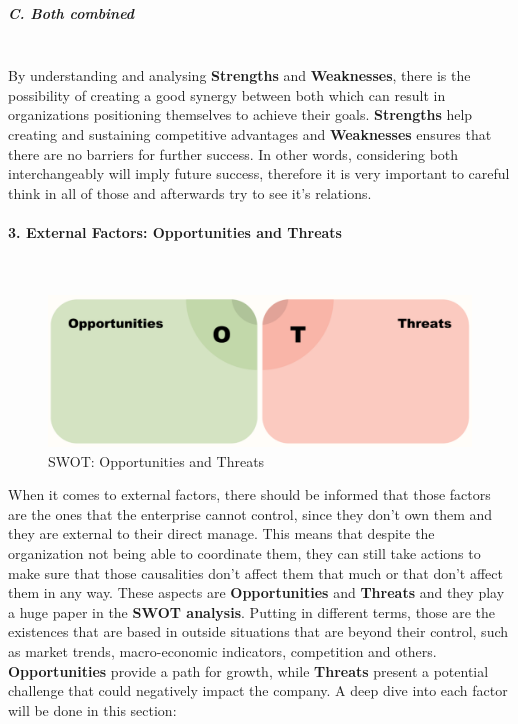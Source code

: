 \subparagraph{C. Both combined}\mbox{}\\
By understanding and analysing \textbf{Strengths} and \textbf{Weaknesses}, there is the possibility of creating a good synergy between both which can result in organizations positioning themselves to achieve their goals. \textbf{Strengths} help creating and sustaining competitive advantages and \textbf{Weaknesses} ensures that there are no barriers for further success. In other words, considering both interchangeably will imply future success, therefore it is very important to careful think in all of those and afterwards try to see it's relations.


\paragraph{3. External Factors: Opportunities and Threats}\mbox{}\\
\begin{figure}[H]
    \centering
    \includegraphics[width=1\textwidth]{assets/swot/opportunities-threats.png} %
    \caption{SWOT: Opportunities and Threats}
    \label{fig:sample-image} 
\end{figure}
When it comes to external factors, there should be informed that those factors are the ones that the enterprise cannot control, since they don't own them and they are external to their direct manage. This means that despite the organization not being able to coordinate them, they can still take actions to make sure that those causalities don't affect them that much or that don't affect them in any way. These aspects are \textbf{Opportunities} and \textbf{Threats} and they play a huge paper in the \textbf{SWOT analysis}. Putting in different terms, those are the existences that are based in outside situations that are beyond their control, such as market trends, macro-economic indicators, competition and others. \textbf{Opportunities} provide a path for growth, while \textbf{Threats} present a potential challenge that could negatively impact the company.
A deep dive into each factor will be done in this section:

